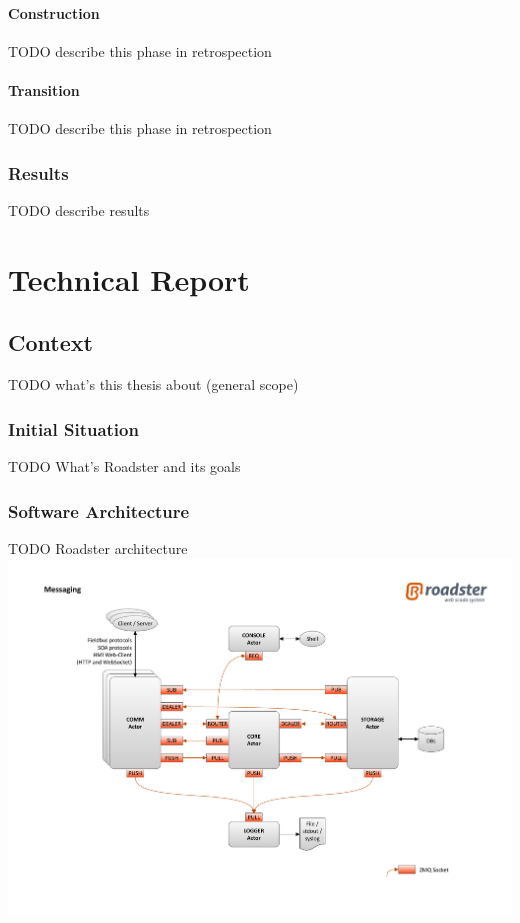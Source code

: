 \documentclass[a4paper]{report}
\begin{document}
\subsection*{Construction}
TODO describe this phase in retrospection

\subsection*{Transition}
TODO describe this phase in retrospection

\section*{Results}
TODO describe results


\tableofcontents
\listoffigures
\listoftables
\lstlistoflistings

\pagebreak
{}
\setcounter{page}{1}
\part{Technical Report}

\chapter{Context}
TODO what's this thesis about (general scope)

\section{Initial Situation}
TODO What's Roadster and its goals

\section{Software Architecture}
TODO Roadster architecture\\

\includegraphics[trim=4cm 2cm 3.5cm 2.8cm, clip=true, width=\textwidth]{img/roadster_arch.pdf}
\end{document}
